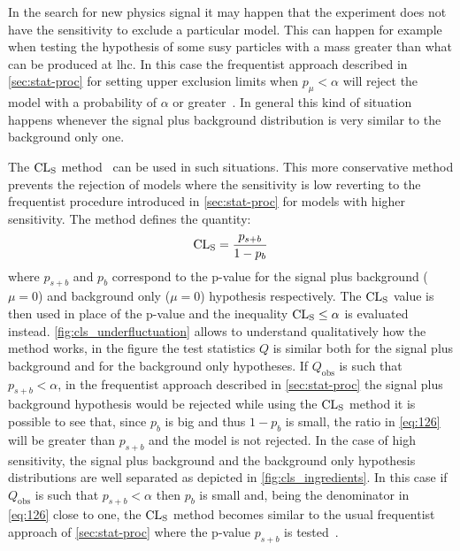 In the search for new physics signal it may happen that the experiment does not
have the sensitivity to exclude a particular model. This can happen for example
when testing the hypothesis of some \gls{susy} particles with a mass greater
than what can be produced at \gls{lhc}. In this case the frequentist approach
described in \cref{sec:stat-proc} for setting upper exclusion limits when
$p_\mu < \alpha$ will reject the model with a probability of $\alpha$ or
greater~\cite{CowanCLsPlots}. In general this kind of situation happens whenever
the signal plus background distribution is very similar to the background only
one.

The $\mathrm{CL}_\mathrm{S}$ method~\cite{CLsMethod} can be used in such situations. This more
conservative method prevents the rejection of models where the sensitivity is
low reverting to the frequentist procedure introduced in \cref{sec:stat-proc}
for models with higher sensitivity. The method defines the quantity:
\begin{equation}
  \label{eq:126}
  \mathrm{CL}_\mathrm{S} = \frac{p_{s + b}}{1 - p_b}
\end{equation}
where $p_{s + b}$ and $p_b$ correspond to the p-value for the signal plus
background ($\mu = 0$) and background only ($\mu = 0$) hypothesis
respectively. The $\mathrm{CL}_\mathrm{S}$ value is then used in place of the p-value and the
inequality $\mathrm{CL}_\mathrm{S} \leq \alpha$ is evaluated
instead. \cref{fig:cls_underfluctuation} allows to understand qualitatively how
the method works, in the figure the test statistics $Q$ is similar both for the
signal plus background and for the background only hypotheses. If
$Q_\mathrm{obs}$ is such that $p_{s + b} < \alpha$, in the frequentist approach
described in \cref{sec:stat-proc} the signal plus background hypothesis would be
rejected while using the $\mathrm{CL}_\mathrm{S}$ method it is possible to see that, since $p_b$
is big and thus $1 - p_b$ is small, the ratio in \cref{eq:126} will be greater
than $p_{s + b}$ and the model is not rejected. In the case of high sensitivity,
the signal plus background and the background only hypothesis distributions are
well separated as depicted in \cref{fig:cls_ingredients}. In this case if
$Q_\mathrm{obs}$ is such that $p_{s + b} < \alpha$ then $p_b$ is small and,
being the denominator in \cref{eq:126} close to one, the $\mathrm{CL}_\mathrm{S}$ method becomes
similar to the usual frequentist approach of \cref{sec:stat-proc} where the
p-value $p_{s + b}$ is tested~\cite{CLsMethod}.

